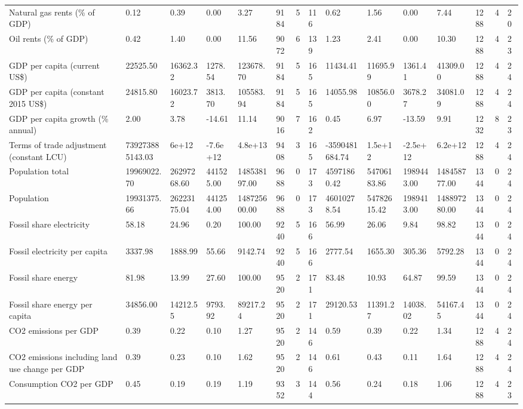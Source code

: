\begin{longtable}{lllllllllllllll}
Natural gas rents (\% of GDP) & 0.12 & 0.39 & 0.00 & 3.27 & 9184 & 5 & 116 & 0.62 & 1.56 & 0.00 & 7.44 & 1288 & 4 & 20\\
Oil rents (\% of GDP) & 0.42 & 1.40 & 0.00 & 11.56 & 9072 & 6 & 139 & 1.23 & 2.41 & 0.00 & 10.30 & 1288 & 4 & 23\\
GDP per capita (current US\$) & 22525.50 & 16362.32 & 1278.54 & 123678.70 & 9184 & 5 & 165 & 11434.41 & 11695.99 & 1361.41 & 41309.00 & 1288 & 4 & 24\\
GDP per capita (constant 2015 US\$) & 24815.80 & 16023.72 & 3813.70 & 105583.94 & 9184 & 5 & 165 & 14055.98 & 10856.00 & 3678.27 & 34081.09 & 1288 & 4 & 24\\
\addlinespace
GDP per capita growth (\% annual) & 2.00 & 3.78 & -14.61 & 11.14 & 9016 & 7 & 162 & 0.45 & 6.97 & -13.59 & 9.91 & 1232 & 8 & 23\\
Terms of trade adjustment (constant LCU) & 739273885143.03 & 6e+12 & -7.6e+12 & 4.8e+13 & 9408 & 3 & 165 & -3590481684.74 & 1.5e+12 & -2.5e+12 & 6.2e+12 & 1288 & 4 & 24\\
Population total & 19969022.70 & 26297268.60 & 441525.00 & 148538197.00 & 9688 & 0 & 173 & 45971860.42 & 54706183.86 & 1989443.00 & 148458777.00 & 1344 & 0 & 24\\
Population & 19931375.66 & 26223175.04 & 441254.00 & 148725600.00 & 9688 & 0 & 173 & 46010278.54 & 54782615.42 & 1989413.00 & 148897280.00 & 1344 & 0 & 24\\
Fossil share electricity & 58.18 & 24.96 & 0.20 & 100.00 & 9240 & 5 & 166 & 56.99 & 26.06 & 9.84 & 98.82 & 1344 & 0 & 24\\
\addlinespace
Fossil electricity per capita & 3337.98 & 1888.99 & 55.66 & 9142.74 & 9240 & 5 & 166 & 2777.54 & 1655.30 & 305.36 & 5792.28 & 1344 & 0 & 24\\
Fossil share energy & 81.98 & 13.99 & 27.60 & 100.00 & 9520 & 2 & 171 & 83.48 & 10.93 & 64.87 & 99.59 & 1344 & 0 & 24\\
Fossil share energy per capita & 34856.00 & 14212.55 & 9793.92 & 89217.24 & 9520 & 2 & 171 & 29120.53 & 11391.27 & 14038.02 & 54167.45 & 1344 & 0 & 24\\
CO2 emissions per GDP & 0.39 & 0.22 & 0.10 & 1.27 & 9520 & 2 & 146 & 0.59 & 0.39 & 0.22 & 1.34 & 1288 & 4 & 24\\
CO2 emissions including land use change per GDP & 0.39 & 0.23 & 0.10 & 1.62 & 9520 & 2 & 146 & 0.61 & 0.43 & 0.11 & 1.64 & 1288 & 4 & 24\\
\addlinespace
Consumption CO2 per GDP & 0.45 & 0.19 & 0.19 & 1.19 & 9352 & 3 & 144 & 0.56 & 0.24 & 0.18 & 1.06 & 1288 & 4 & 23\\

\end{longtable}
